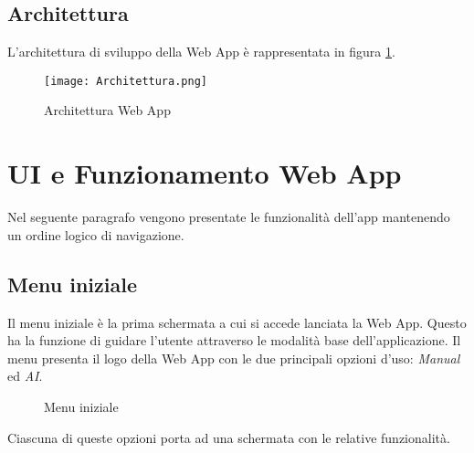 \subsection{Architettura}
\label{sec:architettura}

L'architettura di sviluppo della Web App è rappresentata in figura \ref{fig:architettura_app}.

\begin{figure}[h]
    \centering
    \texttt{[image: Architettura.png]}
    \caption{Architettura Web App}
    \label{fig:architettura_app}
\end{figure}







\section{UI e Funzionamento Web App}
\label{sec:funzionamento}

Nel seguente paragrafo vengono presentate le funzionalità dell'app mantenendo un ordine logico di navigazione.


\subsection{Menu iniziale}
\label{sec:menu_iniziale}

Il menu iniziale è la prima schermata a cui si accede lanciata la Web App. Questo ha la funzione di guidare l'utente attraverso le modalità base dell'applicazione. Il menu presenta il logo della Web App con le due principali opzioni d'uso: \textit{Manual} ed \textit{AI}.


\begin{figure}[h]
    \centering
    \caption{Menu iniziale}
    \label{fig:bot-menu-iniziale}
\end{figure}

\noindent Ciascuna di queste opzioni porta ad una schermata con le relative funzionalità.

